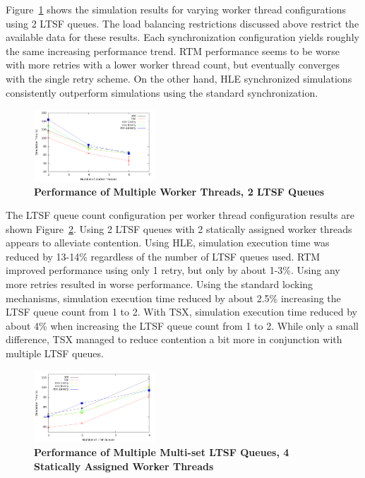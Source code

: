 \documentclass{sig-alternate}
\begin{document}
Figure~\ref{fig:noThrMig_timeVSthreads_2schedQ} shows the simulation results for varying
worker thread configurations using 2 LTSF queues.  The load balancing restrictions
discussed above restrict the available data for these results.  Each synchronization
configuration yields roughly the same increasing performance trend.  RTM performance seems
to be worse with more retries with a lower worker thread count, but eventually converges
with the single retry scheme.  On the other hand, HLE synchronized simulations
consistently outperform simulations using the standard synchronization.

\begin{figure}
    \centering
    \graphicspath{ {./figures/} }
    \includegraphics[width=0.4\textwidth,keepaspectratio]{hugeepidemicsim-NOmig-timeVSthreads-multiset-2schQ}
    \caption{\textbf{Performance of Multiple Worker Threads, 2 LTSF Queues}}
    \label{fig:noThrMig_timeVSthreads_2schedQ}
\end{figure}

The LTSF queue count configuration per worker thread configuration results are shown
Figure~\ref{fig:noThrMig_timeVSschq_4threads}.  Using 2 LTSF queues with 2 statically
assigned worker threads appears to alleviate contention.  Using HLE, simulation execution
time was reduced by 13-14\% regardless of the number of LTSF queues used.  RTM improved
performance using only 1 retry, but only by about 1-3\%.  Using any more retries resulted
in worse performance.  Using the standard locking mechanisms, simulation execution time
reduced by about 2.5\% increasing the LTSF queue count from 1 to 2.  With TSX, simulation
execution time reduced by about 4\% when increasing the LTSF queue count from 1 to 2.
While only a small difference, TSX managed to reduce contention a bit more in conjunction
with multiple LTSF queues.

\begin{figure}
    \centering
    \graphicspath{ {./figures/} }
    \includegraphics[width=0.4\textwidth,keepaspectratio]{hugeepidemicsim-NOmig-timeVSschedQs-multiset-4thread}
    \caption{\textbf{Performance of Multiple Multi-set LTSF Queues, 4 Statically Assigned Worker Threads}}
    \label{fig:noThrMig_timeVSschq_4threads}
\end{figure}
\end{document}
